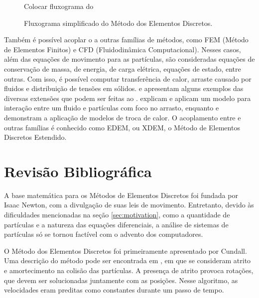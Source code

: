 \begin{figure}[h]
	\caption{Fluxograma simplificado do Método dos Elementos Discretos.}
	\begin{center}
		\alert{Colocar fluxograma do \DEM{}}
	\end{center}
	\label{fig:simple_dem_algorithm}
\end{figure}

Também é possível acoplar o \DEM{} a outras famílias de métodos, como FEM (Método de Elementos Finitos) e CFD (Fluidodinâmica Computacional). Nesses casos, além das equações de movimento para as partículas, são consideradas equações de conservação de massa, de energia, de carga elétrica, equações de estado, entre outras. Com isso, é possível computar transferência de calor, arraste causado por fluidos e distribuição de tensões em sólidos.  e  apresentam alguns exemplos das diversas extensões que podem ser feitas ao \DEM{}.  explicam e aplicam um modelo para interação entre um fluido e partículas com foco no arrasto, enquanto  e  demonstram a aplicação de modelos de troca de calor. O acoplamento entre \DEM{} e outras famílias é conhecido como EDEM, ou XDEM, o Método de Elementos Discretos Estendido.

\section{Revisão Bibliográfica}

A base matemática para os Métodos de Elementos Discretos foi fundada por Isaac Newton, com a divulgação de suas leis de movimento. Entretanto, devido às dificuldades mencionadas na seção \ref{sec:motivation}, como a quantidade de partículas e a natureza das equações diferenciais, a análise de sistemas de partículas só se tornou factível com o advento dos computadores.

O Método dos Elementos Discretos foi primeiramente apresentado por Cundall. Uma descrição do método pode ser encontrada em , em que se consideram atrito e amortecimento na colisão das partículas. A presença de atrito provoca rotações, que devem ser solucionadas juntamente com as posições. Nesse algoritmo, as velocidades eram preditas como constantes durante um passo de tempo.

